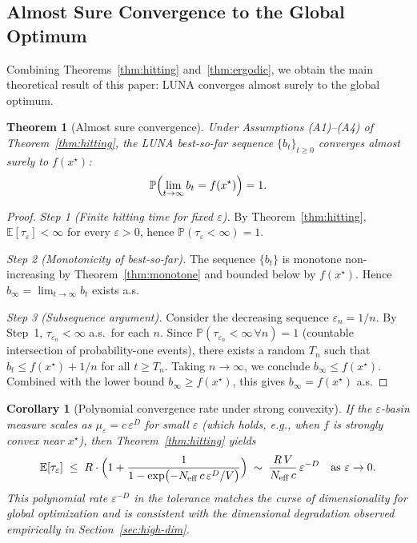 \documentclass[review]{elsarticle}
\newtheorem{theorem}{Theorem}
\newtheorem{corollary}{Corollary}
\theoremstyle{definition}
\begin{document}
\subsection{Almost Sure Convergence to the Global Optimum}
\label{sec:asconv}

Combining Theorems~\ref{thm:hitting} and~\ref{thm:ergodic}, we obtain the main theoretical result of this paper: LUNA converges almost surely to the global optimum.

\begin{theorem}[Almost sure convergence]
\label{thm:asconv}
Under Assumptions (A1)--(A4) of Theorem~\ref{thm:hitting}, the LUNA best-so-far sequence $\{b_t\}_{t\ge 0}$ converges almost surely to $f(x^\star)$:
\[
\mathbb{P}\Bigl(\lim_{t\to\infty}b_t=f(x^\star)\Bigr)=1.
\]
\end{theorem}

\begin{proof}
\textit{Step 1 (Finite hitting time for fixed $\varepsilon$).} By Theorem~\ref{thm:hitting}, $\mathbb{E}[\tau_\varepsilon]<\infty$ for every $\varepsilon>0$, hence $\mathbb{P}(\tau_\varepsilon<\infty)=1$.

\textit{Step 2 (Monotonicity of best-so-far).} The sequence $\{b_t\}$ is monotone non-increasing by Theorem~\ref{thm:monotone} and bounded below by $f(x^\star)$. Hence $b_\infty=\lim_{t\to\infty}b_t$ exists a.s.

\textit{Step 3 (Subsequence argument).} Consider the decreasing sequence $\varepsilon_n=1/n$. By Step~1, $\tau_{\varepsilon_n}<\infty$ a.s.\ for each $n$. Since $\mathbb{P}(\tau_{\varepsilon_n}<\infty\,\forall n)=1$ (countable intersection of probability-one events), there exists a random $T_n$ such that $b_t\le f(x^\star)+1/n$ for all $t\ge T_n$. Taking $n\to\infty$, we conclude $b_\infty\le f(x^\star)$. Combined with the lower bound $b_\infty\ge f(x^\star)$, this gives $b_\infty=f(x^\star)$ a.s.
\end{proof}

\begin{corollary}[Polynomial convergence rate under strong convexity]
\label{cor:polyrate}
If the $\varepsilon$-basin measure scales as $\mu_\varepsilon=c\,\varepsilon^D$ for small $\varepsilon$ (which holds, e.g., when $f$ is strongly convex near $x^\star$), then Theorem~\ref{thm:hitting} yields
\[
\mathbb{E}[\tau_\varepsilon]\;\le\;R\cdot\Bigl(1+\frac{1}{1-\exp\bigl(-N_{\mathrm{eff}}\,c\,\varepsilon^D/V\bigr)}\Bigr)\;\sim\;\frac{R\,V}{N_{\mathrm{eff}}\,c}\,\varepsilon^{-D}\quad\text{as }\varepsilon\to 0.
\]
This polynomial rate $\varepsilon^{-D}$ in the tolerance matches the curse of dimensionality for global optimization and is consistent with the dimensional degradation observed empirically in Section~\ref{sec:high-dim}.
\end{corollary}
\end{document}
